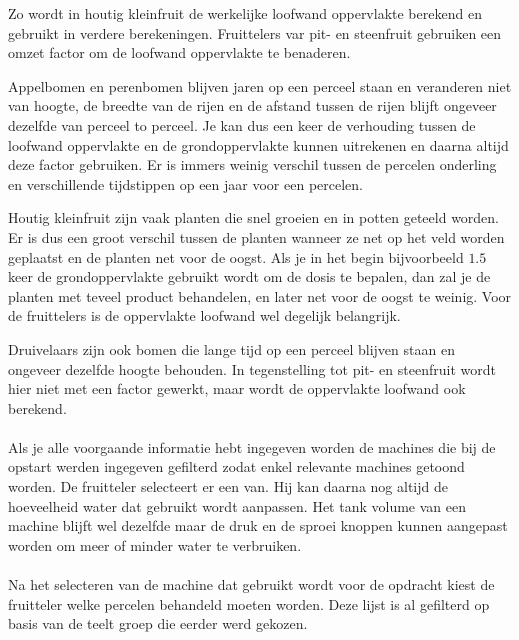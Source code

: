 Zo wordt in houtig kleinfruit de werkelijke loofwand oppervlakte berekend en gebruikt in
verdere berekeningen. Fruittelers var pit- en steenfruit gebruiken een omzet factor om de
loofwand oppervlakte te benaderen.

Appelbomen en perenbomen blijven jaren op een perceel staan en veranderen niet van hoogte,
de breedte van de rijen en de afstand tussen de rijen blijft ongeveer dezelfde van perceel
to perceel. Je kan dus een keer de verhouding tussen de loofwand oppervlakte en de
grondoppervlakte kunnen uitrekenen en daarna altijd deze factor gebruiken. Er is immers
weinig verschil tussen de percelen onderling en verschillende tijdstippen op een jaar voor
een percelen.

Houtig kleinfruit zijn vaak planten die snel groeien en in potten geteeld worden.  Er is
dus een groot verschil tussen de planten wanneer ze net op het veld worden geplaatst en de
planten net voor de oogst. Als je in het begin bijvoorbeeld $1.5$ keer de grondoppervlakte
gebruikt wordt om de dosis te bepalen, dan zal je de planten met teveel product
behandelen, en later net voor de oogst te weinig. Voor de fruittelers is de oppervlakte
loofwand wel degelijk belangrijk.

Druivelaars zijn ook bomen die lange tijd op een perceel blijven staan en ongeveer
dezelfde hoogte behouden. In tegenstelling tot pit- en steenfruit wordt hier niet met een
factor gewerkt, maar wordt de oppervlakte loofwand ook berekend.

\paragraph {} Als je alle voorgaande informatie hebt ingegeven worden de machines die bij
de opstart werden ingegeven gefilterd zodat enkel relevante machines getoond worden. De
fruitteler selecteert er een van. Hij kan daarna nog altijd de hoeveelheid water dat
gebruikt wordt aanpassen. Het tank volume van een machine blijft wel dezelfde maar de druk
en de sproei knoppen kunnen aangepast worden om meer of minder water te verbruiken.

\paragraph {} Na het selecteren van de machine dat gebruikt wordt voor de opdracht kiest
de fruitteler welke percelen behandeld moeten worden. Deze lijst is al gefilterd op basis
van de teelt groep die eerder werd gekozen.

